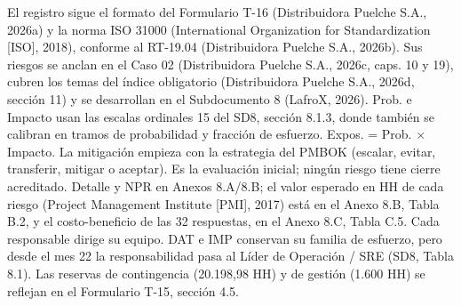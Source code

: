 
El registro sigue el formato del Formulario T-16 (Distribuidora Puelche S.A., 2026a) y la norma ISO 31000 (International Organization for Standardization [ISO], 2018), conforme al RT-19.04 (Distribuidora Puelche S.A., 2026b). Sus riesgos se anclan en el Caso 02 (Distribuidora Puelche S.A., 2026c, caps. 10 y 19), cubren los temas del índice obligatorio (Distribuidora Puelche S.A., 2026d, sección 11) y se desarrollan en el Subdocumento 8 (LafroX, 2026). Prob. e Impacto usan las escalas ordinales 1\textendash{}5 del SD8, sección 8.1.3, donde también se calibran en tramos de probabilidad y fracción de esfuerzo. Expos. = Prob. \ensuremath{\times} Impacto. La mitigación empieza con la estrategia del PMBOK (escalar, evitar, transferir, mitigar o aceptar). Es la evaluación inicial; ningún riesgo tiene cierre acreditado. Detalle y NPR en Anexos 8.A/8.B; el valor esperado en HH de cada riesgo (Project Management Institute [PMI], 2017) está en el Anexo 8.B, Tabla B.2, y el costo-beneficio de las 32 respuestas, en el Anexo 8.C, Tabla C.5. Cada responsable dirige su equipo. DAT e IMP conservan su familia de esfuerzo, pero desde el mes 22 la responsabilidad pasa al Líder de Operación / SRE (SD8, Tabla 8.1). Las reservas de contingencia (20.198,98 HH) y de gestión (1.600 HH) se reflejan en el Formulario T-15, sección 4.5.


